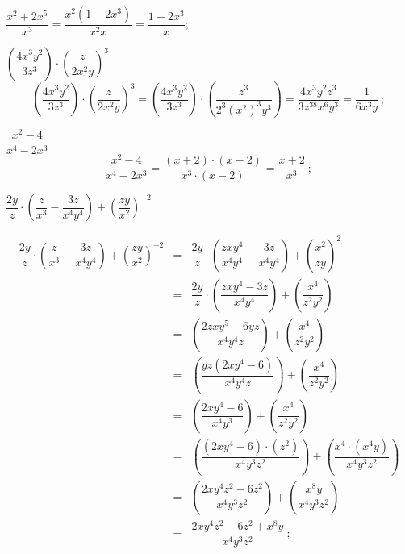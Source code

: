 \begin{exem}
  $\dfrac{x^2+2x^5}{x^3}= \dfrac{x^2(1+2x^3)}{x^2 x}= \dfrac{1+2x^3}{x}$;
 \end{exem}
 
 \begin{exem}
  $\left(\dfrac{4x^3y^2}{3z^3}\right) \cdot \left(\dfrac{z}{2x^2y} \right)^3$
\begin{equation}
\left(\dfrac{4x^3y^2}{3z^3}\right) \cdot \left(\dfrac{z}{2x^2y} \right)^3 = \left(\dfrac{4x^3y^2}{3z^3}\right) \cdot \left(\dfrac{z^3}{2^3(x^2)^3y^3} \right)= \dfrac{4x^3y^2z^3}{3z^38x^6y^3}= \dfrac{1}{6x^3y} \ ;
\end{equation}
  \end{exem}
 
 \begin{exem}
 $\dfrac{x^2 - 4}{x^4 - 2x^3}$
\begin{equation}
\dfrac{x^2 - 4}{x^4 - 2x^3}= \dfrac{(x+2) \cdot (x-2)}{x^3 \cdot (x - 2)}= \dfrac{x+2}{x^3} \ ; 
\end{equation}
  \end{exem}
 
 \begin{exem}
  $\dfrac{2y}{z} \cdot \left( \dfrac{z}{x^3} - \dfrac{3z}{x^4y^4} \right) + \left( \dfrac{zy}{x^2} \right)^{-2}$
  
  \begin{eqnarray*}
   \dfrac{2y}{z} \cdot \left( \dfrac{z}{x^3} - \dfrac{3z}{x^4y^4} \right) + \left( \dfrac{zy}{x^2} \right)^{-2} 
   &=& \dfrac{2y}{z} \cdot \left( \dfrac{zxy^4}{x^4y^4} - \dfrac{3z}{x^4y^4} \right) + \left( \dfrac{x^2}{zy} \right)^{2} \\
   &=& \dfrac{2y}{z} \cdot \left( \dfrac{zxy^4 - 3z}{x^4y^4} \right) + \left( \dfrac{x^4}{z^2y^2} \right) \\
   &=& \left( \dfrac{2zxy^5 - 6yz}{x^4y^4z} \right) + \left( \dfrac{x^4}{z^2y^2} \right) \\
   &=& \left( \dfrac{yz(2xy^4 - 6)}{x^4y^4z} \right) + \left( \dfrac{x^4}{z^2y^2} \right) \\
   &=& \left( \dfrac{2xy^4 - 6}{x^4y^3} \right) + \left( \dfrac{x^4}{z^2y^2} \right) \\
   &=& \left( \dfrac{(2xy^4 - 6) \cdot (z^2)}{x^4y^3z^2} \right) + \left( \dfrac{x^4 \cdot (x^4y)}{x^4y^3z^2} \right) \\
   &=& \left( \dfrac{2xy^4z^2 - 6z^2}{x^4y^3z^2} \right) + \left( \dfrac{x^8y}{x^4y^3z^2} \right) \\
   &=& \dfrac{2xy^4z^2 - 6z^2 + x^8y}{x^4y^3z^2} \ ;
  \end{eqnarray*}
 \end{exem}
 
